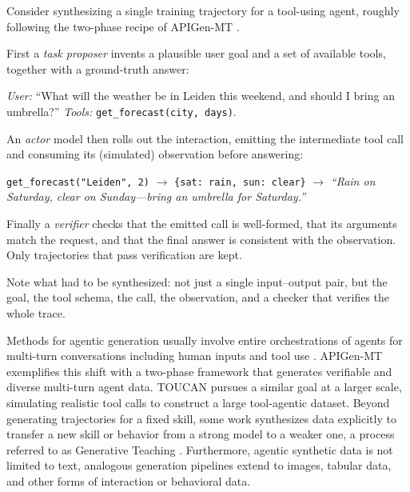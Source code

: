 \begin{example}
Consider synthesizing a single training trajectory for a tool-using agent, roughly following the two-phase recipe of APIGen-MT \citep{NEURIPS2025_5e3661f7}. 

First a \emph{task proposer} invents a plausible user goal and a set of available tools, together with a ground-truth answer:

\emph{User:} ``What will the weather be in Leiden this weekend, and should I bring an umbrella?'' \quad \emph{Tools:} \texttt{get\_forecast(city, days)}.

An \emph{actor} model then rolls out the interaction, emitting the intermediate tool call and consuming its (simulated) observation before answering:

\begin{center}\small
\texttt{get\_forecast("Leiden", 2)} $\rightarrow$ \texttt{\{sat: rain, sun: clear\}} $\rightarrow$ \emph{``Rain on Saturday, clear on Sunday---bring an umbrella for Saturday.''}
\end{center}

Finally a \emph{verifier} checks that the emitted call is well-formed, that its arguments match the request, and that the final answer is consistent with the observation. Only trajectories that pass verification are kept. 

Note what had to be synthesized: not just a single input--output pair, but the goal, the tool schema, the call, the observation, and a checker that verifies the whole trace.
\end{example}

Methods for agentic generation  usually involve entire orchestrations of agents for multi-turn conversations including human inputs and tool use \citep{wu2024autogen}. APIGen-MT \citep{NEURIPS2025_5e3661f7} exemplifies this shift with a two-phase framework that generates verifiable and diverse multi-turn agent data. TOUCAN \citep{xu2025toucansynthesizing15mtoolagentic} pursues a similar goal at a larger scale, simulating realistic tool calls to construct a large tool-agentic dataset. Beyond generating trajectories for a fixed skill, some work synthesizes data explicitly to transfer a new skill or behavior from a strong model to a weaker one, a process referred to as Generative Teaching \citep{crispino2023agent}. Furthermore, agentic synthetic data is  not limited to text, analogous generation pipelines extend to images, tabular data, and other forms of interaction or behavioral data.

